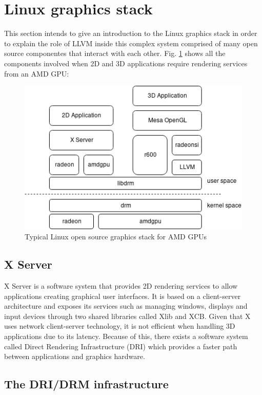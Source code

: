 \documentclass[12pt,a4paper,oneside]{article}
\begin{document}
\newpage
\section{Linux graphics stack}

This section intends to give an introduction to the Linux graphics stack in order
to explain the role of LLVM inside this complex system comprised of many open
source componentes that interact with each other. Fig. \ref{fig:stack} shows all
the components involved when 2D and 3D applications require rendering services
from an AMD GPU:
\begin{figure}[H]
\centering
  \includegraphics[scale=0.75]{img/stack.png}
  \caption{Typical Linux open source graphics stack for AMD GPUs}
  \label{fig:stack}
\end{figure}

\subsection{X Server}

X Server is a software system that provides 2D rendering services to allow
applications creating graphical user interfaces. It is based on a client-server
architecture and exposes its services such as managing windows, displays and
input devices through two shared libraries called Xlib and XCB. Given that X uses
network client-server technology, it is not efficient when handling 3D applications
due to its latency. Because of this, there exists a software system called Direct
Rendering Infrastructure (DRI) which provides a faster path between applications
and graphics hardware.

\subsection{The DRI/DRM infrastructure}
\end{document}
